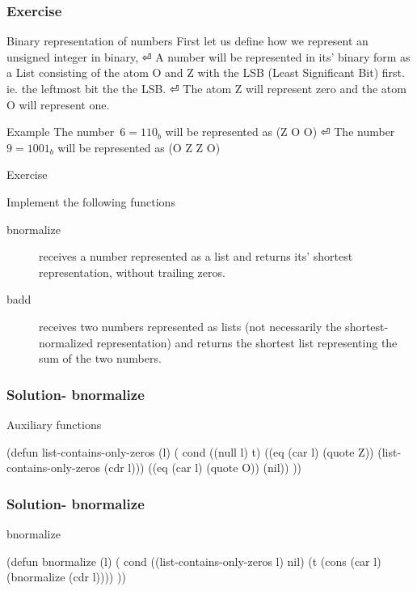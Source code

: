 \documentclass[fleqn]{beamer}
\begin{document}
\begin{frame}
\frametitle{Exercise}
\begin{block}{Binary representation of numbers}
  First let us define how we represent an unsigned integer in binary, ⏎
  A number will be represented in its' binary form as a List consisting of the atom O and Z with the LSB (Least Significant Bit) first. ie. the leftmost bit the the LSB. ⏎
  The atom Z will represent zero and the atom O will represent one.
\end{block}

\begin{block}{Example}
  The number~$6={110}_b$ will be represented as (Z O O) ⏎
  The number~$9={1001}_b$ will be represented as (O Z Z O)
\end{block}
\end{frame}

\begin{frame}{Exercise}
\begin{block}{Implement the following functions}
  \begin{description}
    \item [bnormalize] receives a number represented as a list and returns its'
      shortest representation, without trailing zeros.
    \item [badd] receives two numbers represented as lists (not necessarily the
      shortest-
      normalized representation) and returns the shortest list representing the
      sum of the two numbers.
  \end{description}
\end{block}
\end{frame}

\begin{frame}[fragile]
\frametitle{Solution- bnormalize}
\begin{block}{Auxiliary functions}
  \begin{LISP}
(defun list-contains-only-zeros (l) (
  cond
    ((null l) t)
    ((eq (car l) (quote Z))
      (list-contains-only-zeros (cdr l)))
    ((eq (car l) (quote O)) (nil))
))
    \end{LISP}
\end{block}
\end{frame}

\begin{frame}[fragile]
\frametitle{Solution- bnormalize}
\begin{block}{bnormalize}
  \begin{LISP}
(defun bnormalize (l) (
  cond
    ((list-contains-only-zeros l) nil)
    (t (cons (car l) (bnormalize (cdr l))))
))
    \end{LISP}
\end{block}
\end{frame}
\end{document}
